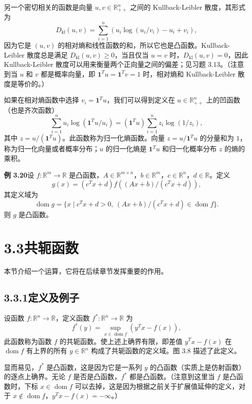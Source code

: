 \documentclass[UTF8, 12pt, fontset=fandol, oneside]{ctexart}
\DeclareMathOperator{\dom}{dom}
\begin{document}
另一个密切相关的函数是向量 $u,v\in\mathbb{R}_{++}^n$ 之间的 Kullback-Leibler 散度，其形式为
\begin{equation}
D_{\mathrm{kl}}(u,v)=\sum_{i=1}^n\left(u_i\log(u_i/v_i)-u_i+v_i\right),
\tag{3.17}
\end{equation}
因为它是 $(u,v)$ 的相对熵和线性函数的和，所以它也是凸函数。Kullback-Leibler 散度总是满足 $D_{\mathrm{kl}}(u,v)\geq0$，当且仅当 $u=v$ 时，$D_{\mathrm{kl}}(u,v)=0$，因此 Kullback-Leibler 散度可以用来衡量两个正向量之间的偏差；见习题 3.13。（注意到当 $u$ 和 $v$ 都是概率向量，即 $\mathbf{1}^Tu=\mathbf{1}^Tv=1$ 时，相对熵和 Kullback-Leibler 散度是等价的。）

如果在相对熵函数中选择 $v_i=\mathbf{1}^Tu$，我们可以得到定义在 $u\in\mathbb{R}_{++}^n$ 上的凹函数（也是齐次函数）
\[
\sum_{i=1}^n u_i\log(\mathbf{1}^Tu/u_i)
=(\mathbf{1}^Tu)\sum_{i=1}^n z_i\log(1/z_i),
\]
其中 $z=u/(\mathbf{1}^Tu)$。此函数称为归一化熵函数。向量 $z=u/\mathbf{1}^Tu$ 的分量和为 $1$，称为归一化向量或者概率分布；$u$ 的归一化熵是 $\mathbf{1}^Tu$ 和归一化概率分布 $z$ 的熵的乘积。

\noindent\textbf{例 3.20}\quad 设 $f:\mathbb{R}^m\to\mathbb{R}$ 是凸函数，$A\in\mathbb{R}^{m\times n}$，$b\in\mathbb{R}^m$，$c\in\mathbb{R}^n$，$d\in\mathbb{R}$。定义
\[
g(x)=(c^Tx+d)f((Ax+b)/(c^Tx+d)),
\]
其定义域为
\[
\dom g=\{x\mid c^Tx+d>0,\ (Ax+b)/(c^Tx+d)\in\dom f\}.
\]
则 $g$ 是凸函数。

\section*{3.3\quad 共轭函数}

本节介绍一个运算，它将在后续章节发挥重要的作用。

\subsection*{3.3.1\quad 定义及例子}

设函数 $f:\mathbb{R}^n\to\mathbb{R}$，定义函数 $f^*:\mathbb{R}^n\to\mathbb{R}$ 为
\begin{equation}
f^*(y)=\sup_{x\in\dom f}\left(y^Tx-f(x)\right),
\tag{3.18}
\end{equation}
此函数称为函数 $f$ 的共轭函数。使上述上确界有限，即差值 $y^Tx-f(x)$ 在 $\dom f$ 有上界的所有 $y\in\mathbb{R}^n$ 构成了共轭函数的定义域。图 3.8 描述了此定义。

显而易见，$f^*$ 是凸函数，这是因为它是一系列 $y$ 的凸函数（实质上是仿射函数）的逐点上确界。无论 $f$ 是否是凸函数，$f^*$ 都是凸函数。（注意到这里当 $f$ 是凸函数时，下标 $x\in\dom f$ 可以去掉，这是因为根据之前关于扩展值延伸的定义，对于 $x\notin\dom f$，$y^Tx-f(x)=-\infty$。）
\end{document}
